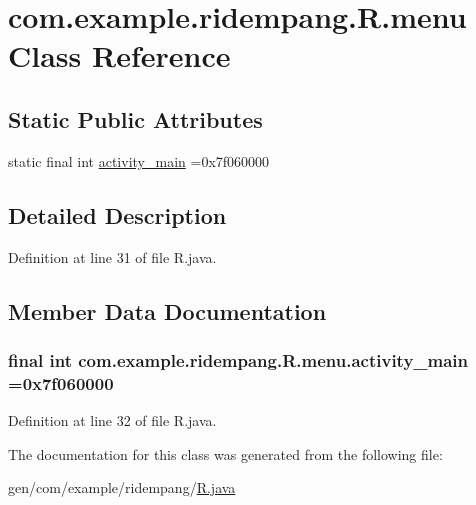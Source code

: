\hypertarget{classcom_1_1example_1_1ridempang_1_1_r_1_1menu}{\section{com.\-example.\-ridempang.\-R.\-menu Class Reference}
\label{classcom_1_1example_1_1ridempang_1_1_r_1_1menu}
}
\subsection*{Static Public Attributes}
\begin{DoxyCompactItemize}
\item 
static final int \hyperlink{classcom_1_1example_1_1ridempang_1_1_r_1_1menu_af8c48c106be793a86e89e0f9bbe9bffd}{activity\-\_\-main} =0x7f060000
\end{DoxyCompactItemize}


\subsection{Detailed Description}


Definition at line 31 of file R.\-java.



\subsection{Member Data Documentation}
\hypertarget{classcom_1_1example_1_1ridempang_1_1_r_1_1menu_af8c48c106be793a86e89e0f9bbe9bffd}{
\subsubsection[{activity\-\_\-main}]{\setlength{\rightskip}{0pt plus 5cm}final int com.\-example.\-ridempang.\-R.\-menu.\-activity\-\_\-main =0x7f060000\hspace{0.3cm}{\ttfamily [static]}}}\label{classcom_1_1example_1_1ridempang_1_1_r_1_1menu_af8c48c106be793a86e89e0f9bbe9bffd}


Definition at line 32 of file R.\-java.



The documentation for this class was generated from the following file\-:\begin{DoxyCompactItemize}
\item 
gen/com/example/ridempang/\hyperlink{_r_8java}{R.\-java}\end{DoxyCompactItemize}
